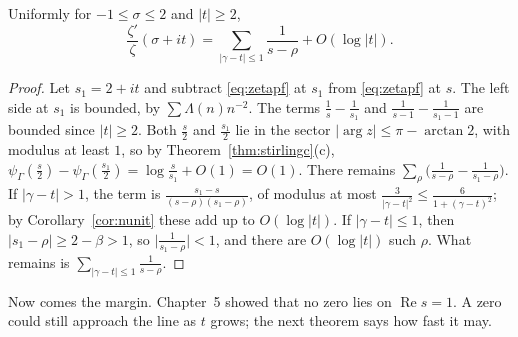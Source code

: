 \begin{proposition}\label{prop:nearzeros}
Uniformly for $-1\le\sigma\le2$ and $|t|\ge2$,
\[
\frac{\zeta'}\zeta(\sigma+it)=\sum_{|\gamma-t|\le1}\frac1{s-\rho}+O(\log|t|).
\]
\end{proposition}
\begin{proof}
Let $s_1=2+it$ and subtract \eqref{eq:zetapf} at $s_1$ from \eqref{eq:zetapf} at $s$. The left side at $s_1$ is bounded, by $\sum\Lambda(n)n^{-2}$. The terms $\frac1s-\frac1{s_1}$ and
$\frac1{s-1}-\frac1{s_1-1}$ are bounded since $|t|\ge2$. Both $\frac s2$ and $\frac{s_1}2$ lie in the sector $|\arg z|\le\pi-\arctan2$, with modulus at least $1$, so by Theorem~\ref{thm:stirlingc}(c),
$\psi_\Gamma(\frac s2)-\psi_\Gamma(\frac{s_1}2)=\log\frac s{s_1}+O(1)=O(1)$. There remains $\sum_\rho\bigl(\frac1{s-\rho}-\frac1{s_1-\rho}\bigr)$. If $|\gamma-t|>1$, the term is
$\frac{s_1-s}{(s-\rho)(s_1-\rho)}$, of modulus at most $\frac3{|\gamma-t|^2}\le\frac6{1+(\gamma-t)^2}$; by Corollary~\ref{cor:nunit} these add up to $O(\log|t|)$. If $|\gamma-t|\le1$, then
$|s_1-\rho|\ge2-\beta>1$, so $\bigl|\frac1{s_1-\rho}\bigr|<1$, and there are $O(\log|t|)$ such $\rho$. What remains is $\sum_{|\gamma-t|\le1}\frac1{s-\rho}$.
\end{proof}

Now comes the margin. Chapter~5 showed that no zero lies on $\operatorname{Re}s=1$. A zero could still approach the line as $t$ grows; the next theorem says how fast it may.


